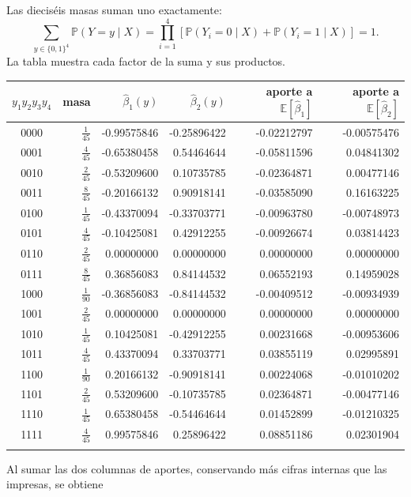 \documentclass[11pt,a4paper]{article}
\newcommand{\E}{\mathbb E}
\newcommand{\Prob}{\mathbb P}
\begin{document}
Las dieciséis masas suman uno exactamente:
\[
\sum_{y\in\{0,1\}^4}\Prob(Y=y\mid X)
=\prod_{i=1}^4[\Prob(Y_i=0\mid X)+\Prob(Y_i=1\mid X)]=1.
\]
La tabla muestra cada factor de la suma y sus productos.
\begin{center}\scriptsize
\begin{tabular}{crrrrr}\toprule
\(y_1y_2y_3y_4\)&masa&\(\widehat\beta_1(y)\)&\(\widehat\beta_2(y)\)&aporte a \(\E[\widehat\beta_1]\)&aporte a \(\E[\widehat\beta_2]\)\\\midrule
0000&$\frac{1}{45}$&-0.99575846&-0.25896422&-0.02212797&-0.00575476\\
0001&$\frac{4}{45}$&-0.65380458&0.54464644&-0.05811596&0.04841302\\
0010&$\frac{2}{45}$&-0.53209600&0.10735785&-0.02364871&0.00477146\\
0011&$\frac{8}{45}$&-0.20166132&0.90918141&-0.03585090&0.16163225\\
0100&$\frac{1}{45}$&-0.43370094&-0.33703771&-0.00963780&-0.00748973\\
0101&$\frac{4}{45}$&-0.10425081&0.42912255&-0.00926674&0.03814423\\
0110&$\frac{2}{45}$&0.00000000&0.00000000&0.00000000&0.00000000\\
0111&$\frac{8}{45}$&0.36856083&0.84144532&0.06552193&0.14959028\\
1000&$\frac{1}{90}$&-0.36856083&-0.84144532&-0.00409512&-0.00934939\\
1001&$\frac{2}{45}$&0.00000000&0.00000000&0.00000000&0.00000000\\
1010&$\frac{1}{45}$&0.10425081&-0.42912255&0.00231668&-0.00953606\\
1011&$\frac{4}{45}$&0.43370094&0.33703771&0.03855119&0.02995891\\
1100&$\frac{1}{90}$&0.20166132&-0.90918141&0.00224068&-0.01010202\\
1101&$\frac{2}{45}$&0.53209600&-0.10735785&0.02364871&-0.00477146\\
1110&$\frac{1}{45}$&0.65380458&-0.54464644&0.01452899&-0.01210325\\
1111&$\frac{4}{45}$&0.99575846&0.25896422&0.08851186&0.02301904\\
\\\bottomrule\end{tabular}\end{center}
Al sumar las dos columnas de aportes, conservando más
cifras internas que las impresas, se obtiene
\end{document}
